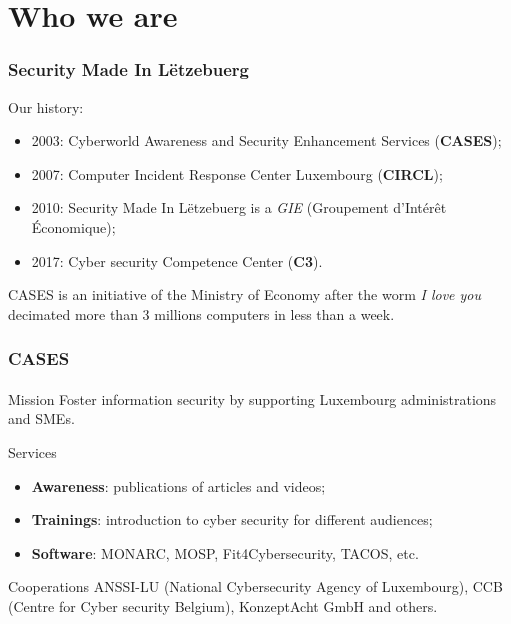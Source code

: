 %
%
\section*{Who we are}
\begin{frame}
  \frametitle{Security Made In Lëtzebuerg}
  Our history:
  \begin{center}
    \begin{itemize}
      \item 2003: Cyberworld Awareness and Security Enhancement Services (\textbf{CASES});
      \item 2007: Computer Incident Response Center Luxembourg (\textbf{CIRCL});
      \item 2010: Security Made In Lëtzebuerg is a \textit{GIE} (Groupement d’Intérêt Économique);
      \item 2017: Cyber security Competence Center (\textbf{C3}).
    \end{itemize}
  \end{center}
  CASES is an initiative of the Ministry of Economy after the worm
  \textit{I love you} decimated more than 3 millions computers in less than a week.
\end{frame}

\begin{frame}
  \frametitle{CASES}
  \framesubtitle{}
  \begin{block}{Mission}
    Foster information security by supporting Luxembourg administrations and SMEs.
  \end{block}

  \begin{block}{Services}
    \begin{center}
      \begin{itemize}
        \item \textbf{Awareness}: publications of articles and videos;
        \item \textbf{Trainings}:
        introduction to cyber security for different audiences;
        \item \textbf{Software}:
        MONARC, MOSP, Fit4Cybersecurity, TACOS, etc.
      \end{itemize}
    \end{center}
  \end{block}

  \begin{block}{Cooperations}
    ANSSI-LU (National Cybersecurity Agency of Luxembourg),
    CCB (Centre for Cyber security Belgium), KonzeptAcht GmbH and others.
  \end{block}
\end{frame}

